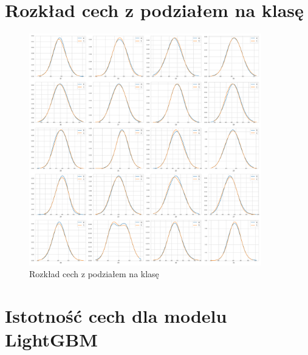 \documentclass[a4paper,12pt]{article}
\begin{document}
\begin{appendices}
        \section{Rozkład cech z podziałem na klasę}\label{appendix:rozklad-cech-numerycznych-klasy}

        \begin{figure}[!h]
            \centering
            \includegraphics[width=0.9\textwidth]{../images/feature-distribution-label.png}
            \caption{Rozkład cech z podziałem na klasę}
        \end{figure}

        \newpage

        \section{Istotność cech dla modelu LightGBM}\label{appendix:feature-importance-lightgbm}


\end{appendices}
\end{document}
